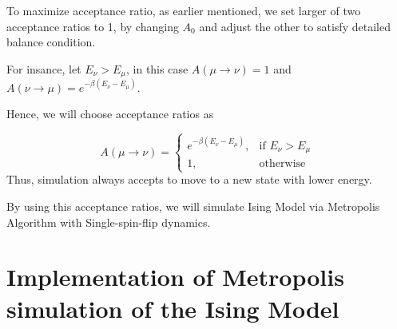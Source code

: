 \documentclass[12pt,fleqn]{report}
\begin{document}
To maximize acceptance ratio, as earlier mentioned, we set larger of two acceptance ratios to 1, by changing $A_0$ and adjust the other to satisfy detailed balance condition. 

For insance, let $E_\nu > E_\mu$, in this case $A(\mu \rightarrow \nu) = 1$ and $A(\nu \rightarrow \mu) = e^{- \beta (E_\nu - E_\mu) }$. 


Hence, we will choose acceptance ratios as


\[
    A(\mu \rightarrow \nu)= 
\begin{cases}
    e^{- \beta (E_\nu - E_\mu)},& \text{if } E_\nu > E_\mu\\
    1,              & \text{otherwise}
\end{cases}
\]Thus, simulation always accepts to move to a new state with lower energy. 

By using this acceptance ratios, we will simulate Ising Model via Metropolis Algorithm with Single-spin-flip dynamics.


\section{Implementation of Metropolis simulation of the Ising Model}
\end{document}
